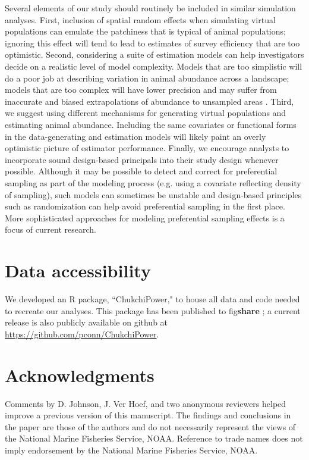 \documentclass[]{rsos}%
\begin{document}
Several elements of our study should routinely be included in similar simulation analyses.  First, inclusion of spatial random effects when simulating virtual populations can emulate the patchiness that is typical of animal populations; ignoring this effect will tend to lead to estimates of survey efficiency that are too optimistic.  Second, considering a suite of estimation models can help investigators decide on a realistic level of model complexity.  Models that are too simplistic will do a poor job at describing variation in animal abundance across a landscape; models that are too complex will have lower precision and may suffer from inaccurate and biased extrapolations of abundance to unsampled areas \cite{ConnEtAl2015b}.  Third, we suggest using different mechanisms for generating virtual populations and estimating animal abundance.  Including the same covariates or functional forms in the data-generating and estimation models will likely paint an overly optimistic picture of estimator performance.  Finally, we encourage analysts to incorporate sound design-based principals into their study design whenever possible. Although it may be possible to detect and correct for preferential sampling as part of the modeling process (e.g. using a covariate reflecting density of sampling), such models can sometimes be unstable and design-based principles such as randomization can help avoid preferential sampling in the first place.  More sophisticated approaches for modeling preferential sampling effects is a focus of current research.

\section*{Data accessibility}  We developed an R package, ``ChukchiPower," to house all data and code needed to recreate our analyses.  This package has been published to fig\textbf{share} \cite{Conn2015ChukchiPower}; a current release is also publicly available on github at \url{https://github.com/pconn/ChukchiPower}.

\section*{Acknowledgments} Comments by D. Johnson, J. Ver Hoef, and two anonymous reviewers helped improve a previous version of this manuscript.  The findings and conclusions in the paper are those of the authors and do not necessarily represent the views of the National Marine Fisheries Service, NOAA.  Reference to trade names does not imply endorsement by the National Marine Fisheries Service, NOAA.
\end{document}
